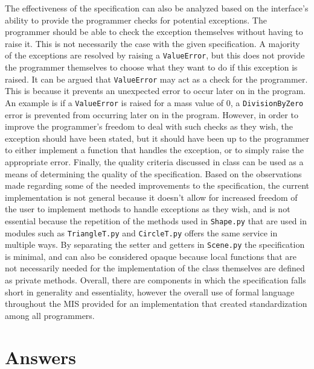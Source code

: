 \documentclass[12pt]{article}
\begin{document}
\newpage
The effectiveness of the specification can also be analyzed based on the interface's ability to provide the programmer checks for potential exceptions. The programmer should be able to check the exception themselves without having to raise it. This is not necessarily the case with the given specification. A majority of the exceptions are resolved by raising a \texttt{ValueError}, but this does not provide the programmer themselves to choose what they want to do if this exception is raised. It can be argued that \texttt{ValueError} may act as a check for the programmer. This is because it prevents an unexpected error to occur later on in the program. An example is if a \texttt{ValueError} is raised for a mass value of 0, a \texttt{DivisionByZero} error is prevented from occurring later on in the program. However, in order to improve the programmer's freedom to deal with such checks as they wish, the exception should have been stated, but it should have been up to the programmer to either implement a function that handles the exception, or to simply raise the appropriate error.
\newline
\newline
Finally, the quality criteria discussed in class can be used as a means of determining the quality of the specification. Based on the observations made regarding some of the needed improvements to the specification, the current implementation is not general because it doesn't allow for increased freedom of the user to implement methods to handle exceptions as they wish, and is not essential because the repetition of the methods used in \texttt{Shape.py} that are used in modules such as \texttt{TriangleT.py} and \texttt{CircleT.py} offers the same service in multiple ways. By separating the setter and getters in \texttt{Scene.py} the specification is minimal, and can also be considered opaque because local functions that are not necessarily needed for the implementation of the class themselves are defined as private methods. Overall, there are components in which the specification falls short in generality and essentiality, however the overall use of formal language throughout the MIS provided for an implementation that created standardization among all programmers.
\newpage

\section{Answers}
\end{document}
